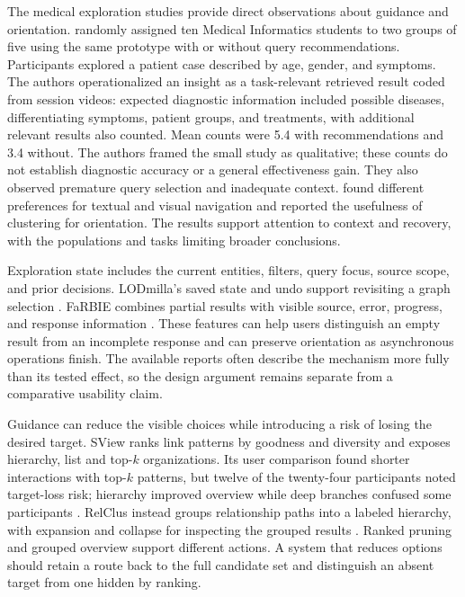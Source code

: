 \documentclass[manuscript,review,screen]{acmart}
\begin{document}
The medical exploration studies provide direct observations about guidance and orientation. \citet{2021_Witschel_Natural_Language-based} randomly assigned ten Medical Informatics students to two groups of five using the same prototype with or without query recommendations. Participants explored a patient case described by age, gender, and symptoms. The authors operationalized an insight as a task-relevant retrieved result coded from session videos: expected diagnostic information included possible diseases, differentiating symptoms, patient groups, and treatments, with additional relevant results also counted. Mean counts were 5.4 with recommendations and 3.4 without. The authors framed the small study as qualitative; these counts do not establish diagnostic accuracy or a general effectiveness gain. They also observed premature query selection and inadequate context. \citet{2022_Grether_Studying_Interaction} found different preferences for textual and visual navigation and reported the usefulness of clustering for orientation. The results support attention to context and recovery, with the populations and tasks limiting broader conclusions.

Exploration state includes the current entities, filters, query focus, source scope, and prior decisions. LODmilla's saved state and undo support revisiting a graph selection \citep{2014_AMA_LODmilla_Shared}. FaRBIE combines partial results with visible source, error, progress, and response information \citep{V3-01117}. These features can help users distinguish an empty result from an incomplete response and can preserve orientation as asynchronous operations finish. The available reports often describe the mechanism more fully than its tested effect, so the design argument remains separate from a comparative usability claim.

Guidance can reduce the visible choices while introducing a risk of losing the desired target. SView ranks link patterns by goodness and diversity and exposes hierarchy, list and top-$k$ organizations. Its user comparison found shorter interactions with top-$k$ patterns, but twelve of the twenty-four participants noted target-loss risk; hierarchy improved overview while deep branches confused some participants \citep{V3-01744}. RelClus instead groups relationship paths into a labeled hierarchy, with expansion and collapse for inspecting the grouped results \citep{V3-02740}. Ranked pruning and grouped overview support different actions. A system that reduces options should retain a route back to the full candidate set and distinguish an absent target from one hidden by ranking.
\end{document}
